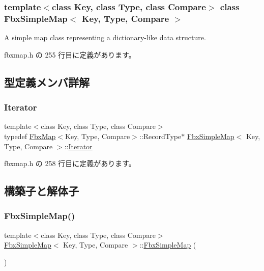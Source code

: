 \subsubsection*{template$<$class Key, class Type, class Compare$>$\newline
class Fbx\+Simple\+Map$<$ Key, Type, Compare $>$}

A simple map class representing a dictionary-\/like data structure. 

 fbxmap.\+h の 255 行目に定義があります。



\subsection{型定義メンバ詳解}
\mbox{\label{class_fbx_simple_map_aaa589eb5e1ccdd11dffd018f3212e13e}} 
\subsubsection{\texorpdfstring{Iterator}{Iterator}}
{\footnotesize\ttfamily template$<$class Key, class Type, class Compare$>$ \\
typedef \hyperlink{class_fbx_map}{Fbx\+Map}$<$Key, Type, Compare$>$\+::Record\+Type$\ast$ \hyperlink{class_fbx_simple_map}{Fbx\+Simple\+Map}$<$ Key, Type, Compare $>$\+::\hyperlink{class_fbx_simple_map_aaa589eb5e1ccdd11dffd018f3212e13e}{Iterator}}



 fbxmap.\+h の 258 行目に定義があります。



\subsection{構築子と解体子}
\mbox{\label{class_fbx_simple_map_a3e89743411abd2e67f84e942787d4a84}} 
\subsubsection{\texorpdfstring{Fbx\+Simple\+Map()}{FbxSimpleMap()}}
{\footnotesize\ttfamily template$<$class Key, class Type, class Compare$>$ \\
\hyperlink{class_fbx_simple_map}{Fbx\+Simple\+Map}$<$ Key, Type, Compare $>$\+::\hyperlink{class_fbx_simple_map}{Fbx\+Simple\+Map} (\begin{DoxyParamCaption}{ }\end{DoxyParamCaption})\hspace{0.3cm}{\ttfamily [inline]}}



